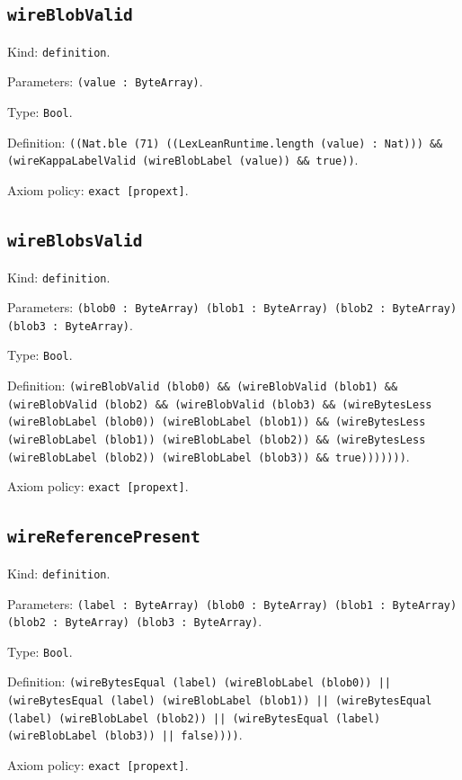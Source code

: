 \documentclass[11pt]{article}
\begin{document}
\subsection*{\texttt{wireBlobValid}}
\noindent Kind: \texttt{definition}.\par
\noindent Parameters: \texttt{(value : ByteArray)}.\par
\noindent Type: \texttt{Bool}.\par
\noindent Definition: \texttt{((Nat.ble (71) ((LexLeanRuntime.length (value) : Nat))) \&\& (wireKappaLabelValid (wireBlobLabel (value)) \&\& true))}.\par
\noindent Axiom policy: \texttt{exact [propext]}.\par
\subsection*{\texttt{wireBlobsValid}}
\noindent Kind: \texttt{definition}.\par
\noindent Parameters: \texttt{(blob0 : ByteArray) (blob1 : ByteArray) (blob2 : ByteArray) (blob3 : ByteArray)}.\par
\noindent Type: \texttt{Bool}.\par
\noindent Definition: \texttt{(wireBlobValid (blob0) \&\& (wireBlobValid (blob1) \&\& (wireBlobValid (blob2) \&\& (wireBlobValid (blob3) \&\& (wireBytesLess (wireBlobLabel (blob0)) (wireBlobLabel (blob1)) \&\& (wireBytesLess (wireBlobLabel (blob1)) (wireBlobLabel (blob2)) \&\& (wireBytesLess (wireBlobLabel (blob2)) (wireBlobLabel (blob3)) \&\& true)))))))}.\par
\noindent Axiom policy: \texttt{exact [propext]}.\par
\subsection*{\texttt{wireReferencePresent}}
\noindent Kind: \texttt{definition}.\par
\noindent Parameters: \texttt{(label : ByteArray) (blob0 : ByteArray) (blob1 : ByteArray) (blob2 : ByteArray) (blob3 : ByteArray)}.\par
\noindent Type: \texttt{Bool}.\par
\noindent Definition: \texttt{(wireBytesEqual (label) (wireBlobLabel (blob0)) || (wireBytesEqual (label) (wireBlobLabel (blob1)) || (wireBytesEqual (label) (wireBlobLabel (blob2)) || (wireBytesEqual (label) (wireBlobLabel (blob3)) || false))))}.\par
\noindent Axiom policy: \texttt{exact [propext]}.\par
\end{document}
